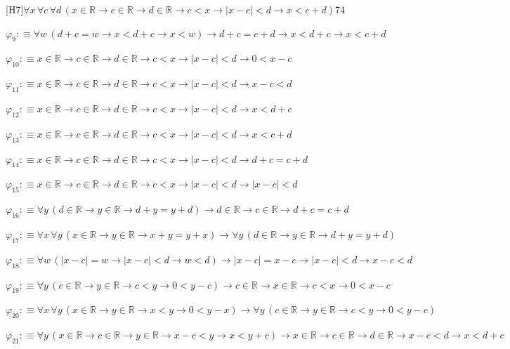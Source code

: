 \begin{fullproof}{[H7]}{$\forall x\,\forall c\,\forall d\,(x \in \mathbb{R} \to c \in \mathbb{R} \to d \in \mathbb{R} \to c < x \to \lvert x - c \rvert < d \to x < c + d)$}{74}
\begin{abbrevlist}
\item $\varphi_{9} :\equiv \forall w\,(d + c = w \to x < d + c \to x < w) \to d + c = c + d \to x < d + c \to x < c + d$
\item $\varphi_{10} :\equiv x \in \mathbb{R} \to c \in \mathbb{R} \to d \in \mathbb{R} \to c < x \to \lvert x - c \rvert < d \to 0 < x - c$
\item $\varphi_{11} :\equiv x \in \mathbb{R} \to c \in \mathbb{R} \to d \in \mathbb{R} \to c < x \to \lvert x - c \rvert < d \to x - c < d$
\item $\varphi_{12} :\equiv x \in \mathbb{R} \to c \in \mathbb{R} \to d \in \mathbb{R} \to c < x \to \lvert x - c \rvert < d \to x < d + c$
\item $\varphi_{13} :\equiv x \in \mathbb{R} \to c \in \mathbb{R} \to d \in \mathbb{R} \to c < x \to \lvert x - c \rvert < d \to x < c + d$
\item $\varphi_{14} :\equiv x \in \mathbb{R} \to c \in \mathbb{R} \to d \in \mathbb{R} \to c < x \to \lvert x - c \rvert < d \to d + c = c + d$
\item $\varphi_{15} :\equiv x \in \mathbb{R} \to c \in \mathbb{R} \to d \in \mathbb{R} \to c < x \to \lvert x - c \rvert < d \to \lvert x - c \rvert < d$
\item $\varphi_{16} :\equiv \forall y\,(d \in \mathbb{R} \to y \in \mathbb{R} \to d + y = y + d) \to d \in \mathbb{R} \to c \in \mathbb{R} \to d + c = c + d$
\item $\varphi_{17} :\equiv \forall x\,\forall y\,(x \in \mathbb{R} \to y \in \mathbb{R} \to x + y = y + x) \to \forall y\,(d \in \mathbb{R} \to y \in \mathbb{R} \to d + y = y + d)$
\item $\varphi_{18} :\equiv \forall w\,(\lvert x - c \rvert = w \to \lvert x - c \rvert < d \to w < d) \to \lvert x - c \rvert = x - c \to \lvert x - c \rvert < d \to x - c < d$
\item $\varphi_{19} :\equiv \forall y\,(c \in \mathbb{R} \to y \in \mathbb{R} \to c < y \to 0 < y - c) \to c \in \mathbb{R} \to x \in \mathbb{R} \to c < x \to 0 < x - c$
\item $\varphi_{20} :\equiv \forall x\,\forall y\,(x \in \mathbb{R} \to y \in \mathbb{R} \to x < y \to 0 < y - x) \to \forall y\,(c \in \mathbb{R} \to y \in \mathbb{R} \to c < y \to 0 < y - c)$
\item $\varphi_{21} :\equiv \forall y\,(x \in \mathbb{R} \to c \in \mathbb{R} \to y \in \mathbb{R} \to x - c < y \to x < y + c) \to x \in \mathbb{R} \to c \in \mathbb{R} \to d \in \mathbb{R} \to x - c < d \to x < d + c$

\end{abbrevlist}
\end{fullproof}
